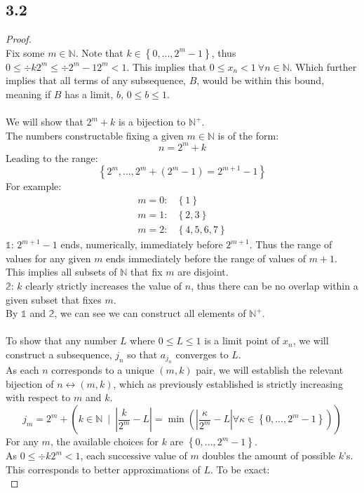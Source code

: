 \subsection*{3.2}
\begin{proof} $ $ \\
    Fix some $m∈ℕ$. Note that $k∈\left\{0,...,2^m-1\right\}$, thus $0≤÷{k}{2^m}≤÷{2^m-1}{2^m}<1$. This implies that $0≤x_n<1\ ∀n∈ℕ$. Which further implies that all terms of any subsequence, $B$, would be within this bound, meaning if $B$ has a limit, $b$, $0≤b≤1$. \\
    \\
    We will show that $2^m+k$ is a bijection to $ℕ^+$. \\
    The numbers constructable fixing a given $m∈ℕ$ is of the form:
    $$n=2^m+k$$
    Leading to the range:
    $$\left\{2^m,...,2^m+(2^m-1)=2^{m+1}-1\right\}$$
    For example:
    \begin{align*}
        m=0:& \left\{1\right\} \\
        m=1:& \left\{2,3\right\} \\
        m=2:& \left\{4,5,6,7\right\}
    \end{align*}
    $𝟙$: $2^{m+1}-1$ ends, numerically, immediately before $2^{m+1}$. Thus the range of values for any given $m$ ends immediately before the range of values of $m+1$. This implies all subsets of $ℕ$ that fix $m$ are disjoint. \\
    $𝟚$: $k$ clearly strictly increases the value of $n$, thus there can be no overlap within a given subset that fixes $m$. \\
    By $𝟙$ and $𝟚$, we can see we can construct all elements of $ℕ^+$. \\
    \\
    To show that any number $L$ where $0≤L≤1$ is a limit point of $x_n$, we will construct a subsequence, $j_n$ so that $a_{j_n}$ converges to $L$. \\
    As each $n$ corresponds to a unique $(m,k)$ pair, we will establish the relevant bijection of $n↔(m,k)$, which as previously established is strictly increasing with respect to $m$ and $k$. \\
    $$j_{m}=2^{m}+\left(k∈ℕ\ ∣\ \left|\frac{k}{2^{m}}-L\right|=\min\left(\left|\frac{κ}{2^{m}}-L\right|∀κ∈\left\{0,...,2^{m}-1\right\}\right)\right)$$
    For any $m$, the available choices for $k$ are $\left\{0,...,2^m-1\right\}$. \\
    As $0≤÷{k}{2^m}<1$, each successive value of $m$ doubles the amount of possible $k$'s. This corresponds to better approximations of $L$. To be exact: \\

\end{proof}

